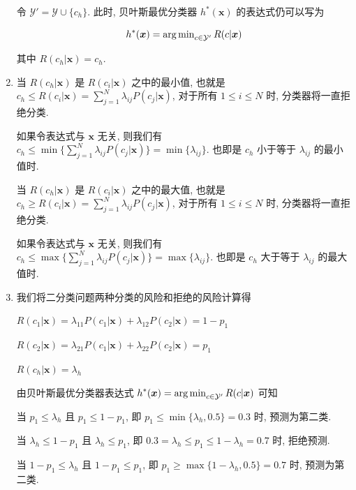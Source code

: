 \documentclass[answers]{exam}  %
\begin{document}
\begin{questions}
\begin{solution}
\begin{enumerate}
            令 $\mathcal{Y}' = \mathcal{Y} \cup \{ c_h \}$. 此时, 贝叶斯最优分类器 $h^{*}(\bm{x})$ 的表达式仍可以写为

            $$
              h^{*}(\bm{x}) = \operatorname{arg\,min}_{c \in \mathcal{Y}'} R(c|\bm{x})
            $$

            其中 $R(c_h|\bm{x}) = c_h$.

      \item

            当 $R(c_h|\bm{x})$ 是 $R(c_i|\bm{x})$ 之中的最小值, 也就是 $\displaystyle c_h \le R(c_i|\bm{x})=\sum_{j=1}^{N}\lambda_{ij}P(c_j|\bm{x})$, 对于所有 $1 \le i \le N$ 时, 分类器将一直拒绝分类.

            如果令表达式与 $\bm{x}$ 无关, 则我们有 $\displaystyle c_h \le \min\{ \sum_{j=1}^{N}\lambda_{ij}P(c_j|\bm{x}) \} = \min\{ \lambda_{ij} \}$. 也即是 $c_h$ 小于等于 $\lambda_{ij}$ 的最小值时.

            当 $R(c_h|\bm{x})$ 是 $R(c_i|\bm{x})$ 之中的最大值, 也就是 $\displaystyle c_h \ge R(c_i|\bm{x})=\sum_{j=1}^{N}\lambda_{ij}P(c_j|\bm{x})$, 对于所有 $1 \le i \le N$ 时, 分类器将一直拒绝分类.

            如果令表达式与 $\bm{x}$ 无关, 则我们有 $\displaystyle c_h \le \max\{ \sum_{j=1}^{N}\lambda_{ij}P(c_j|\bm{x}) \} = \max\{ \lambda_{ij} \}$. 也即是 $c_h$ 大于等于 $\lambda_{ij}$ 的最大值时.

      \item

            我们将二分类问题两种分类的风险和拒绝的风险计算得

            $R(c_1|\bm{x}) = \lambda_{11}P(c_1|\bm{x}) + \lambda_{12}P(c_2|\bm{x}) = 1-p_1$

            $R(c_2|\bm{x}) = \lambda_{21}P(c_1|\bm{x}) + \lambda_{22}P(c_2|\bm{x}) = p_1$

            $R(c_h|\bm{x}) = \lambda_h$

            由贝叶斯最优分类器表达式 $\displaystyle h^{*}(\bm{x}) = \operatorname{arg\,min}_{c \in \mathcal{Y}'} R(c|\bm{x})$ 可知

            当 $p_1 \le \lambda_h$ 且 $p_1 \le 1-p_1$, 即 $p_1 \le \min\{ \lambda_h, 0.5 \} = 0.3$ 时, 预测为第二类.

            当 $\lambda_h \le 1-p_1$ 且 $\lambda_h \le p_1$, 即 $0.3 = \lambda_h \le p_1 \le 1-\lambda_h = 0.7$ 时, 拒绝预测.

            当 $1-p_1 \le \lambda_h$ 且 $1-p_1 \le p_1$, 即 $p_1 \ge \max\{ 1-\lambda_h, 0.5 \} = 0.7$ 时, 预测为第二类.


\end{enumerate}
\end{solution}
\end{questions}
\end{document}
